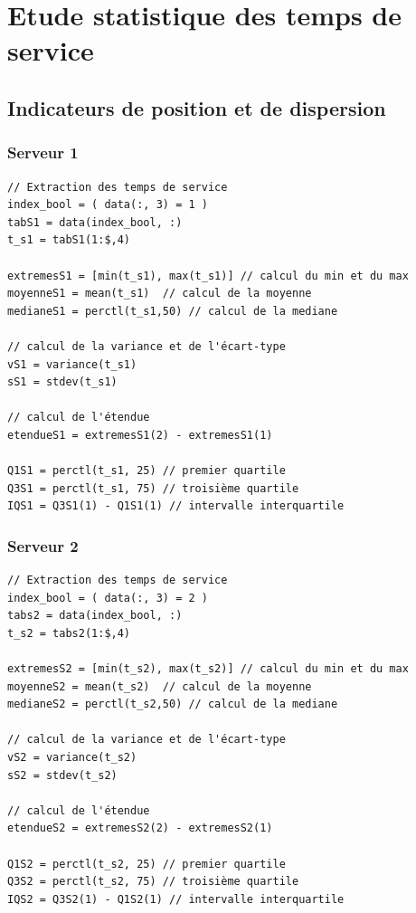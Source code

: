 \documentclass{article}
\begin{document}
\section{Etude statistique des temps de service}

\subsection{Indicateurs de position et de dispersion}

\subsubsection{Serveur 1}
\begin{verbatim}
// Extraction des temps de service
index_bool = ( data(:, 3) = 1 )
tabS1 = data(index_bool, :)
t_s1 = tabS1(1:$,4)

extremesS1 = [min(t_s1), max(t_s1)] // calcul du min et du max
moyenneS1 = mean(t_s1)  // calcul de la moyenne
medianeS1 = perctl(t_s1,50) // calcul de la mediane

// calcul de la variance et de l'écart-type
vS1 = variance(t_s1)
sS1 = stdev(t_s1)

// calcul de l'étendue
etendueS1 = extremesS1(2) - extremesS1(1)

Q1S1 = perctl(t_s1, 25) // premier quartile
Q3S1 = perctl(t_s1, 75) // troisième quartile
IQS1 = Q3S1(1) - Q1S1(1) // intervalle interquartile
\end{verbatim}

\subsubsection{Serveur 2}
\begin{verbatim}
// Extraction des temps de service
index_bool = ( data(:, 3) = 2 )
tabs2 = data(index_bool, :)
t_s2 = tabs2(1:$,4)

extremesS2 = [min(t_s2), max(t_s2)] // calcul du min et du max
moyenneS2 = mean(t_s2)  // calcul de la moyenne
medianeS2 = perctl(t_s2,50) // calcul de la mediane

// calcul de la variance et de l'écart-type
vS2 = variance(t_s2)
sS2 = stdev(t_s2)

// calcul de l'étendue
etendueS2 = extremesS2(2) - extremesS2(1)

Q1S2 = perctl(t_s2, 25) // premier quartile
Q3S2 = perctl(t_s2, 75) // troisième quartile
IQS2 = Q3S2(1) - Q1S2(1) // intervalle interquartile
\end{verbatim}
\end{document}

